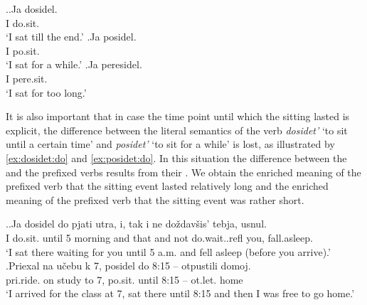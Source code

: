 \ex.\ag.\label{ex:dosidel}Ja dosidel.\\
I do.sit.\\
\trans `I sat till the end.'
\bg.\label{ex:posidel}Ja posidel.\\
I po.sit.\\
\trans `I sat for a while.'
\bg.\label{ex:peresidel}Ja peresidel.\\
I pere.sit.\\
\trans `I sat for too long.'

It is also important that in case the time point until which the sitting lasted is explicit, the difference between the literal semantics of the verb \textit{dosidet'} `to sit until a certain time' and \textit{posidet'} `to sit for a while' is lost, as illustrated by \ref{ex:dosidet:do} and \ref{ex:posidet:do}. In this situation the difference between the  and the prefixed verbs results from their . We obtain the enriched meaning of the prefixed verb that the sitting event lasted relatively long and the enriched meaning of the prefixed verb that the sitting event was rather short. 

\ex.\ag.\label{ex:dosidet:do}Ja dosidel do pjati utra, i, tak i ne do\v{z}dav\v{s}is' tebja, usnul.\\
I do.sit. until 5 morning and that and not do.wait..refl you, fall.asleep.\\
\trans `I sat there waiting for you until 5 a.m. and fell asleep (before you arrive).'\\
\bg.\label{ex:posidet:do}Priexal na u\v{c}ebu k 7, posidel do 8:15 -- otpustili domoj.\\
pri.ride. on study to 7, po.sit. until 8:15 -- ot.let. home\\
\trans `I arrived for the class at 7, sat there until 8:15 and then I was free to go home.'

